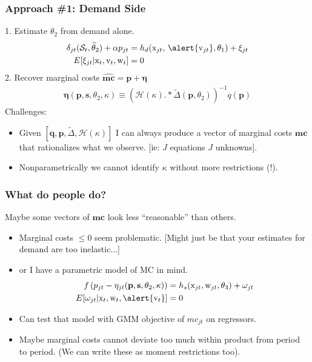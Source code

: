 \documentclass[xcolor=pdftex,dvipsnames,table,mathserif,aspectratio=169]{beamer}
\begin{document}
\begin{frame}
\frametitle{Approach \#1: Demand Side}
1. Estimate $\theta_2$ from demand alone.
\begin{align*}
\delta_{jt}(\mathcal{S}_t,\widetilde{\theta}_2) + \alpha p_{jt} &= h_d(\textrm{x}_{jt}, \, \alert{\textrm{v}_{jt}},\theta_1)  + \xi_{jt} \\
E[\xi_{jt} | \textrm{x}_{t}, \textrm{v}_{t}, \textrm{w}_{t}] &=0
\end{align*}
2. Recover marginal costs $\widehat{\mathbf{mc}} = \mathbf{p} + \boldsymbol{\eta}$
\begin{align*}
\boldsymbol{\eta}(\mathbf{p},\mathbf{s},\theta_2,\kappa) \equiv \left(\mathcal{H}(\kappa).*\tilde{\Delta}(\mathbf{p},\theta_2) \right)^{-1} q(\mathbf{p})
\end{align*}
\vspace{-0.2cm}
Challenges:
\begin{itemize}
\item Given $[\mathbf{q},\mathbf{p},\tilde{\Delta},\mathcal{H}(\kappa)]$ I can always produce a vector of marginal costs $\mathbf{mc}$ that rationalizes what we observe. [ie: $J$ equations $J$ unknowns].
\item Nonparametrically we cannot identify $\kappa$ without more restrictions (!).
\end{itemize}
\end{frame}



\begin{frame}\frametitle{What do people do?}
Maybe some vectors of $\mathbf{mc}$ look less ``reasonable'' than others.
\begin{itemize}
\item Marginal costs $\leq 0$ seem problematic.
[Might just be that your estimates for demand are too inelastic...]
\item or I have a parametric model of MC in mind. 
\begin{align*}
 f \left( p_{jt} - \eta_{jt}(\mathbf{p},\mathbf{s},\theta_2,\kappa) \right) &= h_s(\textrm{x}_{jt}, \textrm{w}_{jt},\theta_3) + \omega_{jt}\\
 E[\omega_{jt} | \textrm{x}_{t}, \textrm{w}_{t}, \alert{\textrm{v}_{t}}]&=0
\end{align*}
\item Can test that model with GMM objective of $mc_{jt}$ on regressors.
\item Maybe marginal costs cannot deviate too much within product from period to period. (We can write these as moment restrictions too).
\end{itemize}
\end{frame}
\end{document}
